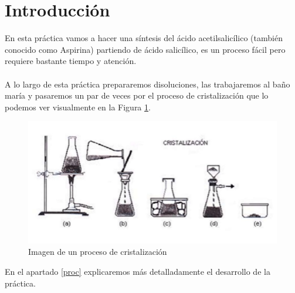 \section{Introducción}
\vspace{0.2cm}
\noindent En esta práctica vamos a hacer una síntesis del ácido acetilsalicílico (también conocido como Aspirina) partiendo de ácido salicílico, es un proceso fácil pero requiere bastante tiempo y atención. \\\\
A lo largo de esta práctica prepararemos disoluciones, las trabajaremos al baño maría y pasaremos un par de veces por el proceso de cristalización que lo podemos ver visualmente en la Figura \ref{fig:crist}.

\vspace{0.4cm}

\begin{figure}[h]
    \centering
    \includegraphics[scale = 0.5]{Figura-3-Proceso-general-de-cristalizacion-por-pasos-Fuente.png}
    \caption{Imagen de un proceso de cristalización}
    \label{fig:crist}
\end{figure}

\vspace{0.6cm}

\noindent En el apartado \ref{proc} explicaremos más detalladamente el desarrollo de la práctica.

\clearpage
